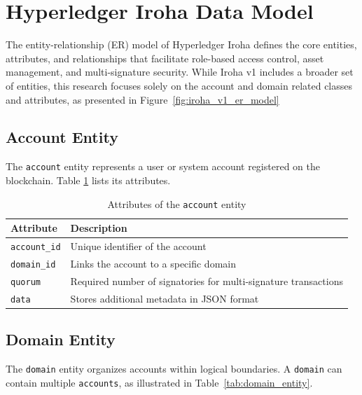 \documentclass[final]{rc-book-2.14}
\begin{document}
\section{Hyperledger Iroha Data Model }
\label{chp:proposed_model:sec:iroha_data_model}


The entity-relationship (ER) model of Hyperledger Iroha defines the core entities, attributes, and relationships that facilitate role-based access control, asset management, and multi-signature security. While Iroha v1 includes a broader set of entities, this research focuses solely on the account and domain related classes and attributes, as presented in Figure~\ref{fig:iroha_v1_er_model}

\subsection{Account Entity}
The \texttt{account} entity represents a user or system account registered on the blockchain. Table \ref{tab:account_entity} lists its attributes.

\begin{table}[h]
    \centering
    \renewcommand{\arraystretch}{1.2}
    \caption{Attributes of the \texttt{account} entity}
    \label{tab:account_entity}
    \begin{tabularx}{\textwidth}{|l|X|}
        \hline
        \textbf{Attribute}   & \textbf{Description}                                            \\ \hline
        \texttt{account\_id} & Unique identifier of the account                                \\ \hline
        \texttt{domain\_id}  & Links the account to a specific domain                          \\ \hline
        \texttt{quorum}      & Required number of signatories for multi-signature transactions \\ \hline
        \texttt{data}        & Stores additional metadata in JSON format                       \\ \hline
    \end{tabularx}
\end{table}


\subsection{Domain Entity}
The \texttt{domain} entity organizes accounts within logical boundaries. A \texttt{domain} can contain multiple \texttt{accounts}, as illustrated in Table~\ref{tab:domain_entity}.
\end{document}
